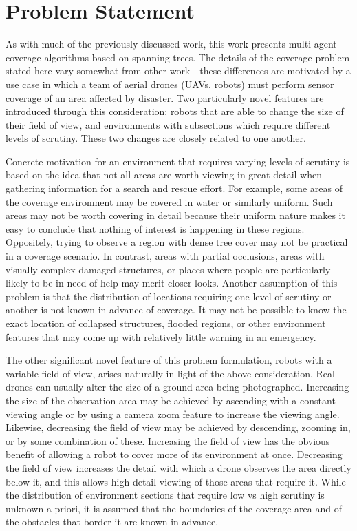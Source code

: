 \section{Problem Statement}

As with much of the previously discussed work, this work presents multi-agent coverage algorithms based on spanning trees. The details of the coverage problem stated here vary somewhat from other work - these differences are motivated by a use case in which a team of aerial drones (UAVs, robots) must perform sensor coverage of an area affected by disaster. Two particularly novel features are introduced through this consideration: robots that are able to change the size of their field of view, and environments with subsections which require different levels of scrutiny. These two changes are closely related to one another.

Concrete motivation for an environment that requires varying levels of scrutiny is based on the idea that not all areas are worth viewing in great detail when gathering information for a search and rescue effort. For example, some areas of the coverage environment may be covered in water or similarly uniform. Such areas may not be worth covering in detail because their uniform nature makes it easy to conclude that nothing of interest is happening in these regions. Oppositely, trying to observe a region with dense tree cover may not be practical in a coverage scenario. In contrast, areas with partial occlusions, areas with visually complex damaged structures, or places where people are particularly likely to be in need of help may merit closer looks. Another assumption of this problem is that the distribution of locations requiring one level of scrutiny or another is not known in advance of coverage. It may not be possible to know the exact location of collapsed structures, flooded regions, or other environment features that may come up with relatively little warning in an emergency.

The other significant novel feature of this problem formulation, robots with a variable field of view, arises naturally in light of the above consideration. Real drones can usually alter the size of a ground area being photographed. Increasing the size of the observation area may be achieved by ascending with a constant viewing angle or by using a camera zoom feature to increase the viewing angle. Likewise, decreasing the field of view may be achieved by descending, zooming in, or by some combination of these. Increasing the field of view has the obvious benefit of allowing a robot to cover more of its environment at once. Decreasing the field of view increases the detail with which a drone observes the area directly below it, and this allows high detail viewing of those areas that require it. While the distribution of environment sections that require low vs high scrutiny is unknown a priori, it is assumed that the boundaries of the coverage area and of the obstacles that border it are known in advance.

